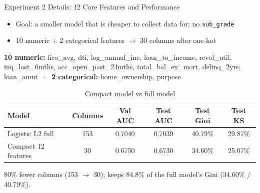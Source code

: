 \documentclass{beamer}
\newcommand{\code}[1]{\texttt{\small #1}}
\begin{document}
\begin{frame}{Experiment 2 Details: 12 Core Features and Performance}
  \begin{itemize}\small
    \item Goal: a smaller model that is cheaper to collect data for; no \code{sub\_grade}
    \item 10 numeric + 2 categorical features $\to$ 30 columns after one-hot
  \end{itemize}
  \scriptsize \textbf{10 numeric:} fico\_avg, dti, log\_annual\_inc, loan\_to\_income, revol\_util, inq\_last\_6mths, acc\_open\_past\_24mths, total\_bal\_ex\_mort, delinq\_2yrs, loan\_amnt \ $\cdot$ \ \textbf{2 categorical:} home\_ownership, purpose
  \begin{table}
    \centering
    \tiny
    \caption{Compact model vs full model}
    \begin{tabular}{lccccc}
      \hline
      \textbf{Model} & \textbf{Columns} & \textbf{Val AUC} & \textbf{Test AUC} & \textbf{Test Gini} & \textbf{Test KS}\\
      \hline
      Logistic L2 full & 153 & 0.7040 & 0.7039 & 40.79\% & 29.87\%\\
      Compact 12 features & 30 & 0.6750 & 0.6730 & 34.60\% & 25.07\%\\
      \hline
    \end{tabular}
  \end{table}
  80\% fewer columns (153 $\to$ 30); keeps 84.8\% of the full model's Gini (34.60\% / 40.79\%).
\end{frame}
\end{document}
